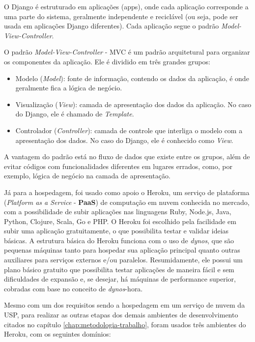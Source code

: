 O Django é estruturado em aplicações (apps), onde cada aplicação corresponde a uma parte do sistema, geralmente independente e reciclável (ou seja, pode ser usada em aplicações Django diferentes). Cada aplicação segue o padrão \textit{Model-View-Controller}.

O padrão \textit{Model-View-Controller} - MVC é um padrão arquitetural para organizar os componentes da aplicação. Ele é dividido em três grandes grupos\cite{thedjangobook2018}:

\begin{itemize}
    \item Modelo (\textit{Model}): fonte de informação, contendo os dados da aplicação, é onde geralmente fica a lógica de negócio.
    \item Visualização (\textit{View}): camada de apresentação dos dados da aplicação. No caso do Django, ele é chamado de \textit{Template}.
    \item Controlador (\textit{Controller}): camada de controle que interliga o modelo com a apresentação dos dados. No caso do Django, ele é conhecido como \textit{View}.
\end{itemize}

A vantagem do padrão está no fluxo de dados que existe entre os grupos, além de evitar códigos com funcionalidades diferentes em lugares errados, como, por exemplo, lógica de negócio na camada de apresentação.

Já para a hospedagem, foi usado como apoio o Heroku, um serviço de plataforma (\textit{Platform as a Service} - \textbf{PaaS}) de computação em nuvem conhecida no mercado, com a possibilidade de subir aplicações nas linguagens Ruby, Node.js, Java, Python, Clojure, Scala, Go e PHP. O Heroku foi escolhido pela facilidade em subir uma aplicação gratuitamente, o que possibilita testar e validar ideias básicas. A estrutura básica do Heroku funciona com o uso de \textit{dynos}, que são pequenas máquinas tanto para hospedar sua aplicação principal quanto outras auxiliares para serviços externos e/ou paralelos. Resumidamente, ele possui um plano básico gratuito que possibilita testar aplicações de maneira fácil e sem dificuldades de expansão e, se desejar, há máquinas de performance superior, cobradas com base no conceito de \textit{dynos}-hora.

Mesmo com um dos requisitos sendo a hospedagem em um serviço de nuvem da USP, para realizar as outras etapas dos demais ambientes de desenvolvimento citados no capítulo \ref{chap:metodologia-trabalho}, foram usados três ambientes do Heroku, com os seguintes domínios:

